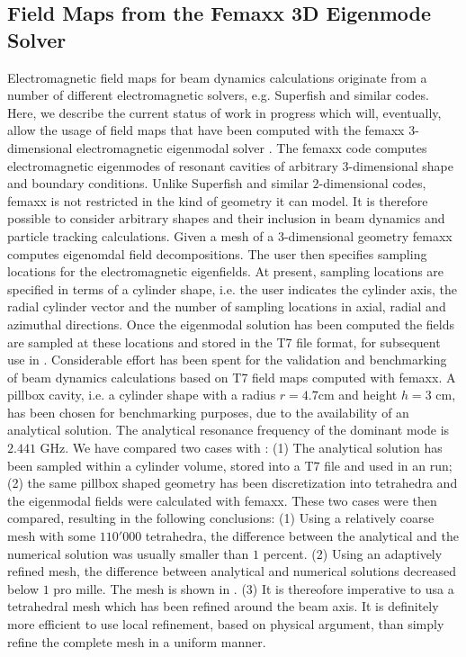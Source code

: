 \subsection{Field Maps from the Femaxx 3D Eigenmode Solver}

Electromagnetic field maps for beam dynamics calculations originate from a number of different
electromagnetic solvers, e.g. Superfish and similar codes.
Here, we describe the current status of work in progress which will, eventually,
allow the usage of field maps that have been computed with the femaxx $3$-dimensional
electromagnetic eigenmodal solver \cite{bib:arbenzetal2001,bib:arbenzetal2006}.
The femaxx code computes electromagnetic eigenmodes of resonant cavities of
arbitrary $3$-dimensional shape and boundary conditions.
Unlike Superfish and similar $2$-dimensional codes, femaxx is not restricted in the
kind of geometry it can model. It is therefore possible to consider arbitrary
shapes and their inclusion in beam dynamics and particle tracking calculations.
Given a mesh of a $3$-dimensional geometry femaxx computes eigenomdal field
decompositions.
The user then specifies sampling locations for the electromagnetic eigenfields.
At present, sampling locations are specified in terms of a cylinder shape,
i.e. the user indicates the cylinder axis, the radial cylinder vector and
the number of sampling locations in axial, radial and azimuthal directions.
Once the eigenmodal solution has been computed the fields are sampled at
these locations and stored in the T7 file format, for subsequent use in \opal.
Considerable effort has been spent for the validation and benchmarking of
beam dynamics calculations based on T7 field maps computed with femaxx.
A pillbox cavity, i.e. a cylinder shape with a radius $r = 4.7$cm and
height $h = 3$ cm, has been chosen for benchmarking purposes,
due to the availability of an analytical solution.
The analytical resonance frequency of the dominant mode is $2.441$ GHz.
We have compared two cases with \opal: (1) The analytical solution has been
sampled within a cylinder volume, stored into a T7 file and used in an \opal
run; (2) the same pillbox shaped geometry has been discretization into tetrahedra
and the eigenmodal fields were calculated with femaxx.
These two cases were then compared, resulting in the following conclusions:
(1) Using a relatively coarse mesh with some $110'000$ tetrahedra, the difference
between the analytical and the numerical solution was usually smaller than
$1$ percent.
(2) Using an adaptively refined mesh, the difference between analytical and
numerical solutions decreased below $1$ pro mille. The mesh is shown
in .
(3) It is thereofore imperative to usa a tetrahedral mesh which has been
refined around the beam axis. It is definitely more efficient to use local
refinement, based on physical argument, than simply refine the complete
mesh in a uniform manner.



